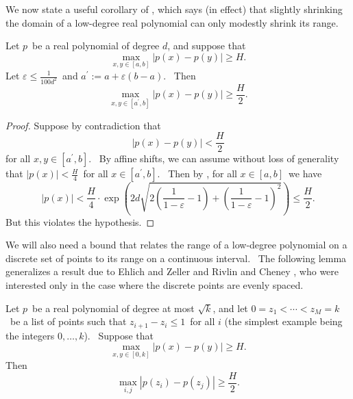 We now state a useful corollary of , which says (in effect)
that slightly shrinking the domain of a low-degree real polynomial can only
modestly shrink its range.

\begin{corollary}
\label{paturicor}Let $p$\ be a real polynomial of degree $d$, and suppose
that
\begin{equation}
\max_{x,y\in\left[ a,b\right] }\left\vert p\left( x\right) -p\left( y\right)
\right\vert \geq H.
\end{equation}
Let $\varepsilon\leq\frac{1}{100d^{2}}$\ and $a^{\prime}:=a+\varepsilon
\left( b-a\right) $. \ Then
\begin{equation}
\max_{x,y\in\left[ a^{\prime},b\right] }\left\vert p\left( x\right) -p\left(
y\right) \right\vert \geq\frac{H}{2}.
\end{equation}
\end{corollary}

\begin{proof}
Suppose by contradiction that
\begin{equation}
\left\vert p\left(  x\right)  -p\left(  y\right)  \right\vert <\frac{H}{2}
\end{equation}
for all $x,y\in\left[  a^{\prime},b\right]  $. \ By affine shifts, we can
assume without loss of generality that $\left\vert p\left(  x\right)
\right\vert <\frac{H}{4}$\ for all $x\in\left[  a^{\prime},b\right]  $. \ Then
by , for all $x\in\left[  a,b\right]  $\ we have
\begin{equation}
\left\vert p\left(  x\right)  \right\vert <\frac{H}{4}\cdot\exp\left(
2d\sqrt{2\left(  \frac{1}{1-\varepsilon}-1\right)  +\left(  \frac
{1}{1-\varepsilon}-1\right)  ^{2}}\right)  \leq\frac{H}{2}.
\end{equation}
But this violates the hypothesis.
\end{proof}

We will also need a bound that relates the range of a low-degree polynomial
on a discrete set of points to its range on a continuous interval. \ The
following lemma generalizes a result due to Ehlich and Zeller \cite{ez} and
Rivlin and Cheney \cite{rc}, who were interested only in the case where the
discrete points are evenly spaced.

\begin{lemma}
\label{ezrclem}Let $p$\ be a real polynomial of degree at most $\sqrt{k}$,
and let $0=z_{1}<\cdots<z_{M}=k$\ be a list of points such that $
z_{i+1}-z_{i}\leq1$\ for all $i$ (the simplest example being the integers $
0,\ldots,k$). \ Suppose that
\begin{equation}
\max_{x,y\in\left[ 0,k\right] }\left\vert p\left( x\right) -p\left( y\right)
\right\vert \geq H.
\end{equation}
Then
\begin{equation}
\max_{i,j}\left\vert p\left( z_{i}\right) -p\left( z_{j}\right) \right\vert
\geq\frac{H}{2}.
\end{equation}
\end{lemma}

